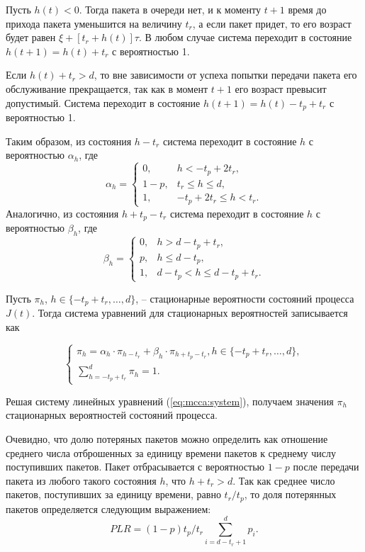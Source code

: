 Пусть $h(t) < 0$. Тогда пакета в очереди нет, и к моменту $t+1$ время до прихода пакета уменьшится на величину $t_r$, а если пакет придет, то его возраст будет равен $\xi + [t_r+h(t)]\tau$. В любом случае система переходит в состояние  $h(t+1)=h(t)+t_r$ с вероятностью 1.

Если $h(t)+t_r > d$, то вне зависимости от успеха попытки передачи пакета его обслуживание прекращается, так как в момент $t+1$ его возраст превысит допустимый. Система переходит в состояние $h(t+1) = h(t) - t_p + t_r$ с вероятностью 1.

Таким образом, из состояния $h-t_r$ система переходит в состояние $h$ с вероятностью $\alpha_h$, где
\[
\alpha_h = \left\{\begin{array}{ll}
    0,  &   h < -t_p+2t_r,  \\
    1-p,	&    t_r\leq h \leq d,      \\
    1,	&    -t_p+2t_r \leq h < t_r.
    \end{array} \right.
\]
Аналогично, из состояния $h+t_p-t_r$ система переходит в состояние $h$ с вероятностью $\beta_h$, где
\[
 \beta_h = \left\{ \begin{array}{ll}
    0,      &   h > d-t_p + t_r, \\
    p,    &	h \leq d-t_p,      \\
    1,      &	d-t_p < h \leq d - t_p + t_r.
    \end{array} \right.
\]

Пусть $\pi_{h}$, $h \in \{-t_p+t_r, \ldots, d\}$, -- стационарные вероятности состояний процесса $J(t)$. Тогда система уравнений для стационарных вероятностей записывается как

\begin{equation}\label{eq:mcca:system}
    \left\{
    \begin{array}{l}
    \pi_{h}= \alpha_h \cdot \pi_{h-t_r} + \beta_h \cdot \pi_{h+t_p-t_r}, h \in \{-t_p+t_r, \ldots, d\}, \\
    \sum \limits_{h=-t_p+t_r}^{d} \pi_{h} = 1.
    \end{array}
    \right.
\end{equation}

Решая систему линейных уравнений (\ref{eq:mcca:system}), получаем значения $\pi_{h}$ стационарных вероятностей состояний процесса.

Очевидно, что долю потеряных пакетов можно определить как отношение среднего числа  отброшенных за единицу времени пакетов к среднему числу поступивших пакетов. Пакет отбрасывается с вероятностью $1-p$ после передачи пакета из любого такого состояния  $h$, что $h+t_r> d$. Так как среднее число пакетов, поступивших за единицу времени, равно $t_r/t_p$, то доля потерянных пакетов определяется следующим выражением:
\begin{equation*}
   PLR=(1-p) t_p/t_r\sum_{i = d - t_r+1}^{d} p_{i}.
\end{equation*}

